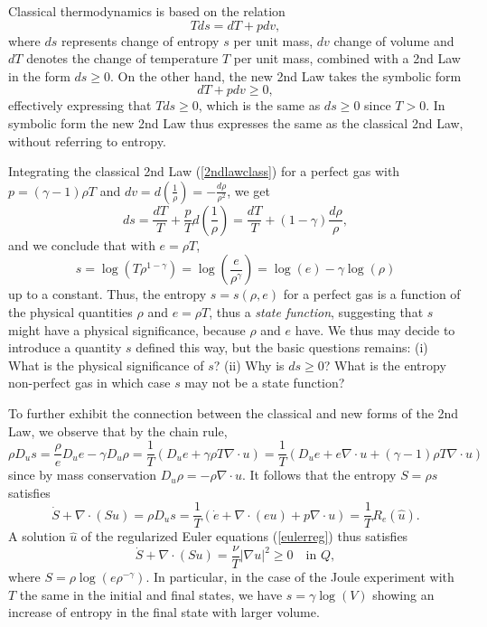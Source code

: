 Classical thermodynamics is based on the relation 
\begin{equation}\label{2ndlawclass}
Tds=dT+pdv, 
\end{equation}
where $ds$ represents change of entropy $s$ per unit mass, $dv$ change
of volume and $dT$ denotes the change of temperature $T$ per unit mass, 
combined with a 2nd Law in the form
$ds\ge 0$. On the other hand, the new 2nd Law takes the symbolic form
\begin{equation}\label{new2ndlawsymb}
dT+pdv\ge 0,
\end{equation}
effectively expressing that $Tds\ge 0$, which is the 
same  as $ds\ge 0$ since $T>0$. In symbolic form the new 2nd Law
thus expresses the same as the classical 2nd Law, without referring 
to entropy.

Integrating the classical 2nd Law
(\ref{2ndlawclass}) for a perfect gas with
$p=(\gamma -1)\rho T$
and $dv=d(\frac{1}{\rho})=-\frac{d\rho}{\rho^2}$, we get
\[
ds=\frac{dT}{T}+\frac{p}{T}d(\frac{1}{\rho})=
\frac{dT}{T}+(1-\gamma )\frac{d\rho}{\rho},
\]
and we conclude that with $e=\rho T$,
\begin{equation}\label{STrho}
s=\log(T\rho^{1-\gamma})=\log(\frac{e}{\rho^{\gamma}})=
\log(e)-\gamma\log(\rho )
\end{equation}
up to a constant. Thus, the entropy $s=s(\rho ,e )$ 
for a perfect gas is a function of the physical quantities 
$\rho$ and $e=\rho T$, thus a \emph{state function}, suggesting  
that $s$ might have a physical significance, because
$\rho$ and $e$ have. We thus may decide to introduce 
a quantity $s$ defined this way, but the basic
questions remains: (i) What is the physical significance of $s$? 
(ii) Why is $ds\ge 0$? What is the
entropy non-perfect gas in which case $s$ may not be a state function? 

To further exhibit the connection between the classical and
new forms of the 2nd Law, we observe that by the chain rule,
\[
\rho D_us=\frac{\rho}{e}D_ue-\gamma D_u\rho=
\frac{1}{T}(D_ue+\gamma \rho T\nabla\cdot u )=
\frac{1}{T}(D_ue+e\nabla\cdot u +(\gamma -1)\rho T\nabla\cdot u)
\]
since by mass conservation $D_u\rho =-\rho\nabla\cdot u$.
It follows that the entropy $S=\rho s$ satisfies 
\begin{equation}
\dot S+\nabla\cdot (Su)=\rho D_us=
\frac{1}{T}(\dot e+\nabla\cdot (eu)+p\nabla\cdot u)
=\frac{1}{T}R_e(\hat u).
\end{equation}
A solution $\hat u$ of the regularized Euler equations (\ref{eulerreg})
thus satisfies 
\begin{equation}\label{2ndlawS}
\dot S+\nabla\cdot (Su)=
\frac{\nu}{T}\vert\nabla u\vert^2\ge 0 \quad\mbox{in }Q,
\end{equation}
where $S=\rho\log(e\rho^{-\gamma})$. In particular, 
in the case of the Joule experiment with $T$ the same
in the initial and final states, we have $s=\gamma\log(V)$ showing
an increase of entropy in the final state with larger volume.   

